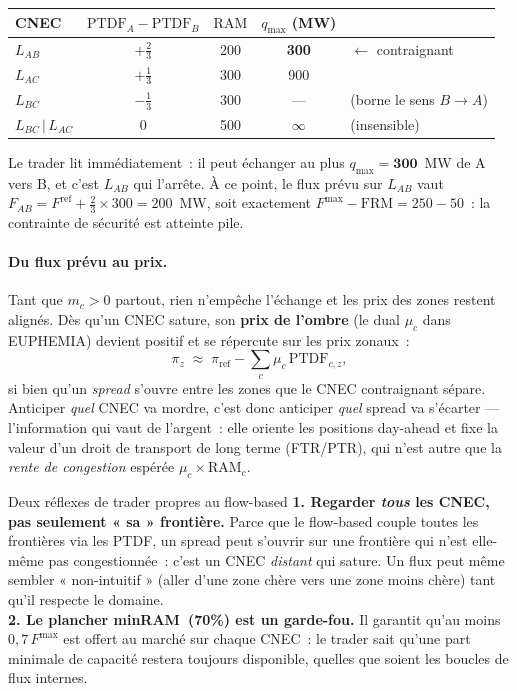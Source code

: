 \documentclass[11pt,a4paper]{article}
\newcommand{\PTDF}{\mathrm{PTDF}}
\newcommand{\RAM}{\mathrm{RAM}}
\newcommand{\Fmax}{F^{\max}}
\newcommand{\Fref}{F^{\mathrm{ref}}}
\newcommand{\FRM}{\mathrm{FRM}}
\begin{document}
\begin{center}
\renewcommand{\arraystretch}{1.25}
\begin{tabular}{l c c c l}
\toprule
CNEC & $\PTDF_A-\PTDF_B$ & $\RAM$ & $q_{\max}$ (MW) & \\
\midrule
$L_{AB}$        & $+\tfrac23$ & 200 & \textbf{300} & $\leftarrow$ contraignant \\
$L_{AC}$        & $+\tfrac13$ & 300 & 900          & \\
$L_{BC}$        & $-\tfrac13$ & 300 & ---          & (borne le sens $B\!\to\!A$) \\
$L_{BC}\,|\,L_{AC}$ & $0$     & 500 & $\infty$     & (insensible) \\
\bottomrule
\end{tabular}
\end{center}

\noindent Le trader lit immédiatement~: il peut échanger au plus
$q_{\max}=\mathbf{300}$~MW de A vers B, et c'est $L_{AB}$ qui l'arrête. À ce
point, le flux prévu sur $L_{AB}$ vaut
$F_{AB}=\Fref+\tfrac23\times 300=200$~MW, soit exactement
$\Fmax-\FRM=250-50$~: la contrainte de sécurité est atteinte pile.

\paragraph{Du flux prévu au prix.} Tant que $m_c>0$ partout, rien n'empêche
l'échange et les prix des zones restent alignés. Dès qu'un CNEC sature, son
\textbf{prix de l'ombre} (le dual $\mu_c$ dans EUPHEMIA) devient positif et se
répercute sur les prix zonaux~:
\[
  \pi_z \;\approx\; \pi_{\text{ref}} - \sum_c \mu_c\,\PTDF_{c,z} ,
\]
si bien qu'un \emph{spread} s'ouvre entre les zones que le CNEC contraignant
sépare. Anticiper \emph{quel} CNEC va mordre, c'est donc anticiper \emph{quel}
spread va s'écarter — l'information qui vaut de l'argent~: elle oriente les
positions day-ahead et fixe la valeur d'un droit de transport de long terme
(FTR/PTR), qui n'est autre que la \emph{rente de congestion} espérée
$\mu_c\times\RAM_c$.

\begin{rembox}{Deux réflexes de trader propres au flow-based}
\textbf{1. Regarder \emph{tous} les CNEC, pas seulement « sa » frontière.}
Parce que le flow-based couple toutes les frontières via les PTDF, un spread
peut s'ouvrir sur une frontière qui n'est elle-même pas congestionnée~: c'est
un CNEC \emph{distant} qui sature. Un flux peut même sembler
« non-intuitif » (aller d'une zone chère vers une zone moins chère) tant
qu'il respecte le domaine.\\[2pt]
\textbf{2. Le plancher minRAM~(70\%) est un garde-fou.} Il garantit qu'au
moins $0{,}7\,\Fmax$ est offert au marché sur chaque CNEC~: le trader sait
qu'une part minimale de capacité restera toujours disponible, quelles que
soient les boucles de flux internes.
\end{rembox}
\end{document}
